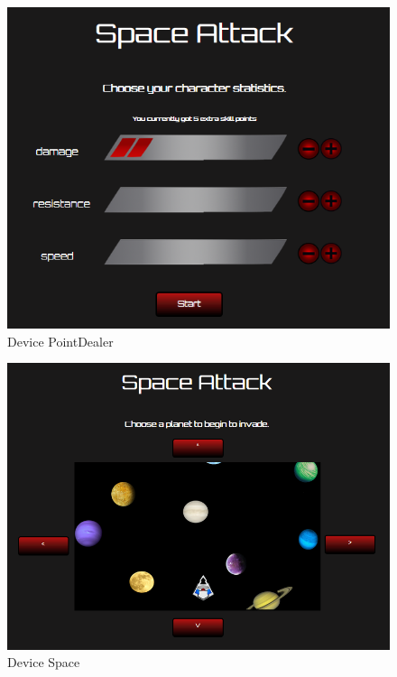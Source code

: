 \documentclass[a4paper,10pt]{article}
\begin{document}
\begin{figure}[htb]
\centering
\includegraphics[width=1\textwidth]{point_dealer}
\caption{Device PointDealer}
\label{fig:pointDealer}
\end{figure}

\begin{figure}[htb]
\centering
\includegraphics[width=1\textwidth]{space}
\caption{Device Space}
\label{fig:space}
\end{figure}
\end{document}
